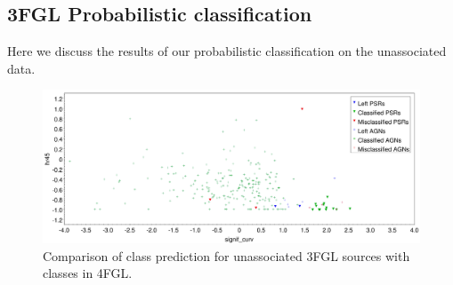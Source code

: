 



\subsection{3FGL Probabilistic classification} 

Here we discuss the results of our probabilistic classification on the unassociated data.
\begin{figure}[h]
\includegraphics[width=\textwidth]{plots/plot_4fglassoc_3fglunassoc_242.pdf}
\caption{Comparison of class prediction for unassociated 3FGL sources with classes in 4FGL. }
\label{fig:Maps_data}
\end{figure}




